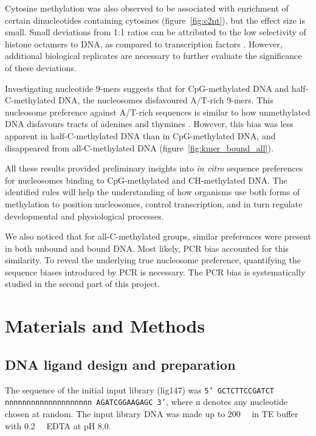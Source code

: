 \documentclass[a4paper, numbers=noenddot]{scrbook}
\begin{document}
Cytosine methylation was also observed to be associated with enrichment of certain dinucleotides containing cytosines (figure~\ref{fig:c2nt}), but the effect size is small.  Small deviations from 1:1 ratios can be attributed to the low selectivity of histone octamers to DNA, as compared to transcription factors \citep{struhl_determinants_2013}. %
However, additional biological replicates are necessary to further evaluate the significance of these deviations.

Investigating nucleotide 9-mers suggests that for CpG-methylated DNA and half-C-methylated DNA, the nucleosomes disfavoured A/T-rich 9-mers.  This nucleosome preference against A/T-rich sequences is similar to how unmethylated DNA disfavours tracts of adenines and thymines \citep{struhl_determinants_2013}. However, this bias was less apparent in half-C-methylated DNA than in CpG-methylated DNA, and disappeared from all-C-methylated DNA (figure~\ref{fig:kmer_bound_all}).

All these results provided preliminary insights into \emph{in vitro} sequence preferences for nucleosomes binding to CpG-methylated and CH-methylated DNA.  The identified rules will help the understanding of how organisms use both forms of methylation to position nucleosomes, control transcription, and in turn regulate developmental and physiological processes.

We also noticed that for all-C-methylated groups, similar preferences were present in both unbound and bound DNA.  Most likely, PCR bias accounted for this similarity.  To reveal the underlying true nucleosome preference, quantifying the sequence biases introduced by PCR is necessary.  The PCR bias is systematically studied in the second part of this project.

\section{Materials and Methods}
\label{sec:emsaselex_methods}

\subsection{DNA ligand design and preparation}
\label{ssec:emsaselex_methods_lig}

The sequence of the initial input library (lig147) was \texttt{5' GCTCTTCCGATCT nnnnnnnnn\-nnnnnnnnnnn AGATCGGAAGAGC 3'}, where n denotes any nucleotide chosen at random. The input library DNA was made up to \SI{200}{\nano\Molar} in TE buffer with \SI{0.2}{\milli\Molar} EDTA at pH 8.0.
\end{document}
